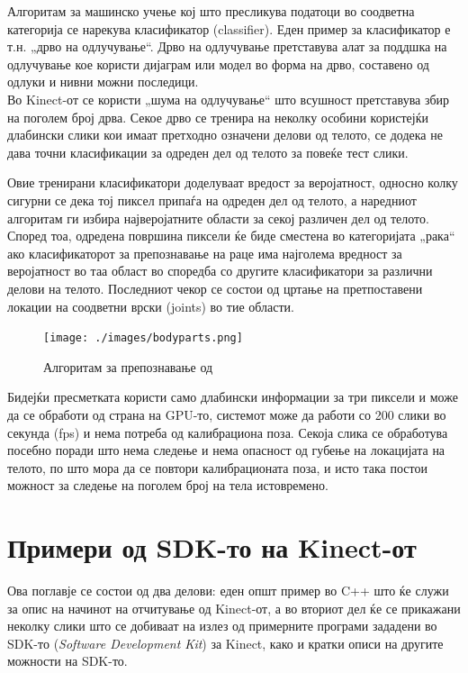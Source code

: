 \documentclass[11pt]{article}
\begin{document}
  Алгоритам за машинско учење кој што пресликува податоци во соодветна категорија се нарекува класификатор (classifier). Еден пример за класификатор е т.н. „дрво на одлучување“. Дрво на одлучување претставува алат за поддшка на одлучување кое користи дијаграм или модел во форма на дрво, составено од одлуки и нивни можни последици.\\
  Во Kinect-от се користи „шума на одлучување“ што всушност претставува збир на поголем број дрва. Секое дрво се тренира на неколку особини користејќи длабински слики кои имаат претходно означени делови од телото, се додека не дава точни класификации за одреден дел од телото за повеќе тест слики.

  Овие тренирани класификатори доделуваат вредост за веројатност, односно колку сигурни се дека тој пиксел припаѓа на одреден дел од телото, а наредниот алгоритам ги избира најверојатните области за секој различен дел од телото. Според тоа, одредена површина пиксели ќе биде сместена во категоријата „рака“ ако класификаторот за препознавање на раце има најголема вредност за веројатност во таа област во споредба со другите класификатори за различни делови на телото. Последниот чекор се состои од цртање на претпоставени локации на соодветни врски (joints) во тие области.

  \begin{figure}[H]
    \texttt{[image: ./images/bodyparts.png]}
    \centering
    \caption{Алгоритам за препознавање од \cite{machinelearning}}
    \label{fig:bodyparts.png}
    \end{figure}

  Бидејќи пресметката користи само длабински информации за три пиксели и може да се обработи од страна на GPU-то, системот може да работи со 200 слики во секунда (fps) и нема потреба од калибрациона поза. Секоја слика се обработува посебно поради што нема следење и нема опасност од губење на локацијата на телото, по што мора да се повтори калибрационата поза, и исто така постои можност за следење на поголем број на тела истовремено.

\newpage

\section{Примери од SDK-то на Kinect-от} \label{sec:example}
  Ова поглавје се состои од два делови: еден општ пример во C++ што ќе служи за опис на начинот на отчитување од Kinect-от, а во вториот дел ќе се прикажани неколку слики што се добиваат на излез од примерните програми зададени во SDK-то (\textit{Software Development Kit}) за Kinect, како и кратки описи на другите можности на SDK-то.
\end{document}

